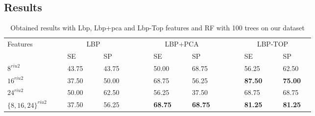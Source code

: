
\subsection{Results}


\begin{table}
\caption{Obtained results with Lbp, Lbp+pca and Lbp-Top features and RF with 100 trees on our dataset}
\centering
\begin{tabular}{lcclcclcccclcclcccclcclc}
\toprule
Features 	& & &\multicolumn{4}{c}{LBP}&	 & & & &\multicolumn{4}{c}{LBP+PCA}& & & & &\multicolumn{4}{c}{LBP-TOP} &\\
  \cmidrule(l){2-8}  \cmidrule(l){10-16}  \cmidrule(l){18-24}
	       & & & SE & & & SP & & & & & SE & & & SP & & & & & SE & & & SP & \\
\midrule
 $8^{riu2}$ 						& & & 43.75 & & & 43.75 & & & & & 50.00 & & & 68.75 & & & & & 56.25 & & & 62.50 & \\	
 $16^{riu2}$						& & & 37.50 & & & 50.00 & & & & & 68.75 & & & 56.25 & & & & & \textbf{87.50} & & & \textbf{75.00} & \\	
 $24^{riu2}$						& & & 50.00 & & & 62.50 & & & & & 56.25 & & & 37.50 & & & & & 68.75 & & & 68.75 & \\
 $\lbrace 8,16,24\rbrace^{riu2}$	& & & 37.50 & & & 56.25 & & & & & \textbf{68.75} & & & \textbf{68.75} & & & & & \textbf{81.25} & & & \textbf{81.25} & \\
\bottomrule
\end{tabular}
\label{tab:LbPTopVolumeResult}
\end{table}

